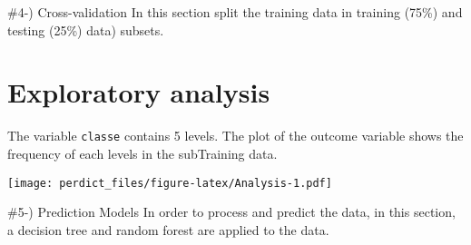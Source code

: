 \documentclass[
]{article}
\newenvironment{Shaded}{\begin{snugshade}}{\end{snugshade}}
\newcommand{\AttributeTok}[1]{\textcolor[rgb]{0.13,0.29,0.53}{#1}}
\newcommand{\ConstantTok}[1]{\textcolor[rgb]{0.56,0.35,0.01}{#1}}
\newcommand{\FloatTok}[1]{\textcolor[rgb]{0.00,0.00,0.81}{#1}}
\newcommand{\FunctionTok}[1]{\textcolor[rgb]{0.13,0.29,0.53}{\textbf{#1}}}
\newcommand{\NormalTok}[1]{#1}
\newcommand{\OtherTok}[1]{\textcolor[rgb]{0.56,0.35,0.01}{#1}}
\newcommand{\SpecialCharTok}[1]{\textcolor[rgb]{0.81,0.36,0.00}{\textbf{#1}}}
\newcommand{\StringTok}[1]{\textcolor[rgb]{0.31,0.60,0.02}{#1}}
\begin{document}
\#4-) Cross-validation In this section split the training data in
training (75\%) and testing (25\%) data) subsets.

\begin{Shaded}
\end{Shaded}

\hypertarget{exploratory-analysis}{%
\section{Exploratory analysis}\label{exploratory-analysis}}

The variable \texttt{classe} contains 5 levels. The plot of the outcome
variable shows the frequency of each levels in the subTraining data.

\begin{Shaded}
\end{Shaded}

\texttt{[image: perdict\_files/figure-latex/Analysis-1.pdf]}

\#5-) Prediction Models In order to process and predict the data, in
this section, a decision tree and random forest are applied to the data.
\end{document}
